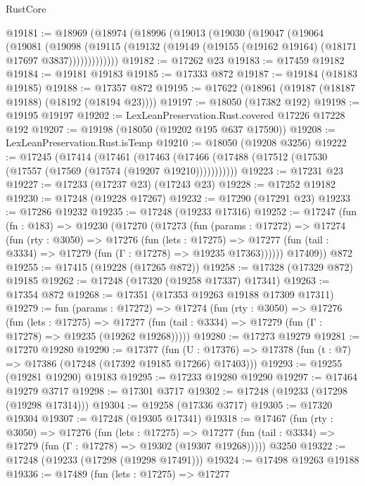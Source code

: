 \begin{lexlean}{RustCore}
\begin{coremodule}
@19181 := @18969
    (@18974
      (@18996
        (@19013
          (@19030
            (@19047
              (@19064
                (@19081
                  (@19098
                    (@19115
                      (@19132 (@19149 (@19155 (@19162 @19164) (@18171 @17697 @3837)))))))))))))
@19182 := @17262 @23
@19183 := @17459 @19182
@19184 := @19181 @19183
@19185 := @17333 @872
@19187 := @19184 (@18183 @19185)
@19188 := @17357 @872
@19195 := @17622 (@18961 (@19187 (@18187 @19188) (@18192 (@18194 @23))))
@19197 := @18050 (@17382 @192)
@19198 := @19195 @19197
@19202 := LexLeanPreservation.Rust.covered @17226 @17228 @192
@19207 := @19198 (@18050 (@19202 @195 @637 @17590))
@19208 := LexLeanPreservation.Rust.isTemp
@19210 := @18050 (@19208 @3256)
@19222 := @17245
    (@17414
      (@17461
        (@17463 (@17466 (@17488 (@17512 (@17530 (@17557 (@17569 (@17574 (@19207 @19210)))))))))))
@19223 := @17231 @23
@19227 := @17233 (@17237 @23) (@17243 @23)
@19228 := @17252 @19182
@19230 := @17248 (@19228 @17267)
@19232 := @17290 (@17291 @23)
@19233 := @17286 @19232
@19235 := @17248 (@19233 @17316)
@19252 := @17247
    (fun (fn : @183) =>
    @19230
      (@17270
        (@17273
          (fun (params : @17272) =>
          @17274
            (fun (rty : @3050) =>
            @17276
              (fun (lets : @17275) =>
              @17277 (fun (tail : @3334) => @17279 (fun (Γ : @17278) => @19235 @17363))))))
        @17409))
    @872
@19255 := @17415 (@19228 (@17265 @872))
@19258 := @17328 (@17329 @872) @19185
@19262 := @17248 (@17320 (@19258 @17337) @17341)
@19263 := @17354 @872
@19268 := @17351 (@17353 @19263 @19188 @17309 @17311)
@19279 := fun (params : @17272) =>
  @17274
    (fun (rty : @3050) =>
    @17276
      (fun (lets : @17275) =>
      @17277 (fun (tail : @3334) => @17279 (fun (Γ : @17278) => @19235 (@19262 @19268)))))
@19280 := @17273 @19279
@19281 := @17270 @19280
@19290 := @17377
    (fun (U : @17376) => @17378 (fun (t : @7) => @17386 (@17248 (@17392 @19185 @17266) @17403)))
@19293 := @19255 (@19281 @19290) @19183
@19295 := @17233 @19280 @19290
@19297 := @17464 @19279 @3717
@19298 := @17301 @3717
@19302 := @17248 (@19233 (@17298 (@19298 @17314)))
@19304 := @19258 (@17336 @3717)
@19305 := @17320 @19304
@19307 := @17248 (@19305 @17341)
@19318 := @17467
    (fun (rty : @3050) =>
    @17276
      (fun (lets : @17275) =>
      @17277 (fun (tail : @3334) => @17279 (fun (Γ : @17278) => @19302 (@19307 @19268)))))
    @3250
@19322 := @17248 (@19233 (@17298 (@19298 @17491)))
@19324 := @17498 @19263 @19188
@19336 := @17489
    (fun (lets : @17275) =>
    @17277

\end{coremodule}
\end{lexlean}
